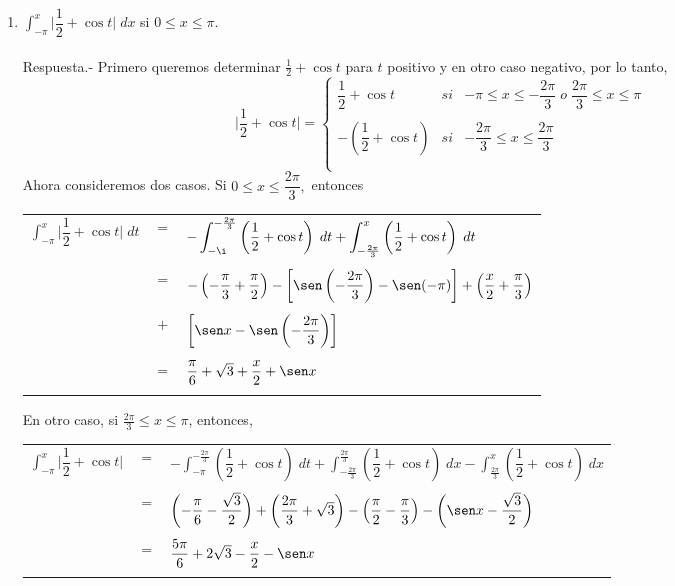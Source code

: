 \begin{enumerate}[\bfseries 1.]
\item $\displaystyle\int_{-\pi}^x \bigg|\dfrac{1}{2}+\cos t\bigg|\; dx$ si $0\leq x \leq \pi$.\\\\
    Respuesta.-\; Primero queremos determinar $\frac{1}{2}+\cos t$ para $t$ positivo y en otro caso negativo, por lo tanto,
    $$\bigg| \dfrac{1}{2}+\cos t \bigg| = \left\{\begin{array}{rcl}
	    \dfrac{1}{2}+\cos t&si&-\pi\leq x \leq -\dfrac{2\pi}{3}\; o \; \dfrac{2\pi}{3}\leq x \leq \pi\\\\
	    -\left(\dfrac{1}{2}+\cos t\right)&si&-\dfrac{2\pi}{3}\leq x \leq \dfrac{2\pi}{3}\\\\
    \end{array}\right.$$
    Ahora consideremos dos casos. Si $0\leq x \leq \dfrac{2\pi}{3},$ entonces 
    \begin{center}
	\begin{tabular}{rcl}
	    $\displaystyle\int_{-\pi}^x \bigg|\dfrac{1}{2}+\cos t\bigg|\; dt$&$=$&$-\displaystyle\int_{-\i}^{-\frac{2\pi}{3}}\left(\dfrac{1}{2}+\cos t\right)\; dt + \int_{-\frac{2\pi}{3}}^x \left(\dfrac{1}{2}+\cos t\right)\; dt$\\\\ &$=$&$-\left(-\dfrac{\pi}{3}+\dfrac{\pi}{2}\right)-\left[\sen\left(-\dfrac{2\pi}{3}\right)-\sen(-\pi)\right]+\left(\dfrac{x}{2}+\dfrac{\pi}{3}\right)$\\\\
									     &$+$&$\left[\sen x - \sen \left(-\dfrac{2\pi}{3}\right)\right]$\\\\
									     &$=$&$\dfrac{\pi}{6}+\sqrt{3}+\dfrac{x}{2}+\sen x$\\\\
	\end{tabular}
    \end{center}

    En otro caso, si $\frac{2\pi}{3}\leq x \leq \pi$, entonces, 
    \begin{center}
	\begin{tabular}{rcl}
	    $\displaystyle\int_{-\pi}^{x} \bigg|\dfrac{1}{2}+\cos t\bigg|$&$=$&$-\displaystyle\int_{-\pi}^{-\frac{2\pi}{3}}\left(\dfrac{1}{2}+\cos t\right)\; dt + \int_{-\frac{2\pi}{3}}^{\frac{2\pi}{3}}\left(\dfrac{1}{2}+\cos t\right)\; dx - \int_{\frac{2\pi}{3}}^x \left(\dfrac{1}{2}+\cos t\right)\; dx$\\\\
									  &$=$&$\left(-\dfrac{\pi}{6}-\dfrac{\sqrt{3}}{2}\right)+\left(\dfrac{2\pi}{3}+\sqrt{3}\right)-\left(\dfrac{\pi}{2}-\dfrac{\pi}{3}\right)-\left(\sen x - \dfrac{\sqrt{3}}{2}\right)$\\\\
									  &$=$&$\dfrac{5\pi}{6}+2\sqrt{3} - \dfrac{x}{2}-\sen x$\\\\
	\end{tabular}
    \end{center}


\end{enumerate}
